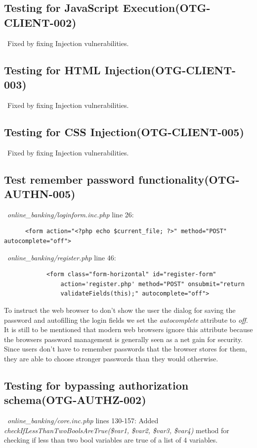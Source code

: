 \documentclass[headsepline,footsepline,footinclude=false,oneside,fontsize=11pt,paper=a4,listof=totoc,bibliography=totoc]{scrbook} %
\begin{document}
 
\subsection{Testing for JavaScript Execution(OTG-CLIENT-002)}\
Fixed by fixing Injection vulnerabilities. \\

 
\subsection{Testing for HTML Injection(OTG-CLIENT-003)}\
Fixed by fixing Injection vulnerabilities.\\ 

\subsection{Testing for CSS Injection(OTG-CLIENT-005)}\
Fixed by fixing Injection vulnerabilities.

\subsection{Test remember password functionality(OTG-AUTHN-005)}\
\textit{online\_banking/loginform.inc.php} line 26:
\begin{lstlisting} 
      <form action="<?php echo $current_file; ?>" method="POST" autocomplete="off">
\end{lstlisting}\
\textit{online\_banking/register.php} line 46:
\begin{lstlisting} 
			<form class="form-horizontal" id="register-form" 
				action='register.php' method="POST" onsubmit="return
				validateFields(this);" autocomplete="off">
\end{lstlisting} 

To instruct the web browser to don't show the user the dialog for saving the password and autofilling the login fields we set the \textit{autocomplete} attribute to \textit{off}. \\

It is still to be mentioned that modern web browsers ignore this attribute because the browsers password management is generally seen as a net gain for security. Since users don't have to remember passwords that the browser stores for them, they are able to choose stronger passwords than they would otherwise.

\subsection{Testing for bypassing authorization schema(OTG-AUTHZ-002)}\
\textit{online\_banking/core.inc.php} lines 130-157:
Added \textit{checkIfLessThanTwoBoolsAreTrue(\$var1, \$var2, \$var3, \$var4)} method for checking if less than two bool variables are true of a list of 4 variables.
\end{document}
